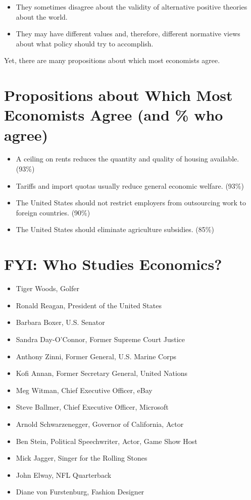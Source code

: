 \documentclass[
]{book}
\providecommand{\tightlist}{%
  \setlength{\itemsep}{0pt}\setlength{\parskip}{0pt}}
\begin{document}
\begin{itemize}
\item
  They sometimes disagree about the validity of alternative positive theories about the world.
\item
  They may have different values and, therefore, different normative views about what policy should try to accomplish.
\end{itemize}

Yet, there are many propositions about which most economists agree.

\hypertarget{propositions-about-which-most-economists-agree-and-who-agree}{%
\section{Propositions about Which Most Economists Agree (and \% who agree)}\label{propositions-about-which-most-economists-agree-and-who-agree}}

\begin{itemize}
\item
  A ceiling on rents reduces the quantity and quality of housing available. (93\%)
\item
  Tariffs and import quotas usually reduce general economic welfare. (93\%)
\item
  The United States should not restrict employers from outsourcing work to foreign countries. (90\%)
\item
  The United States should eliminate agriculture subsidies. (85\%)
\end{itemize}

\hypertarget{fyi-who-studies-economics}{%
\section{FYI: Who Studies Economics?}\label{fyi-who-studies-economics}}

\begin{itemize}
\tightlist
\item
  Tiger Woods, Golfer
\item
  Ronald Reagan, President of the United States
\item
  Barbara Boxer, U.S. Senator
\item
  Sandra Day-O'Connor, Former Supreme Court Justice
\item
  Anthony Zinni, Former General, U.S. Marine Corps
\item
  Kofi Annan, Former Secretary General, United Nations
\item
  Meg Witman, Chief Executive Officer, eBay
\item
  Steve Ballmer, Chief Executive Officer, Microsoft
\item
  Arnold Schwarzenegger, Governor of California, Actor
\item
  Ben Stein, Political Speechwriter, Actor, Game Show Host
\item
  Mick Jagger, Singer for the Rolling Stones
\item
  John Elway, NFL Quarterback
\item
  Diane von Furstenburg, Fashion Designer
\end{itemize}
\end{document}
